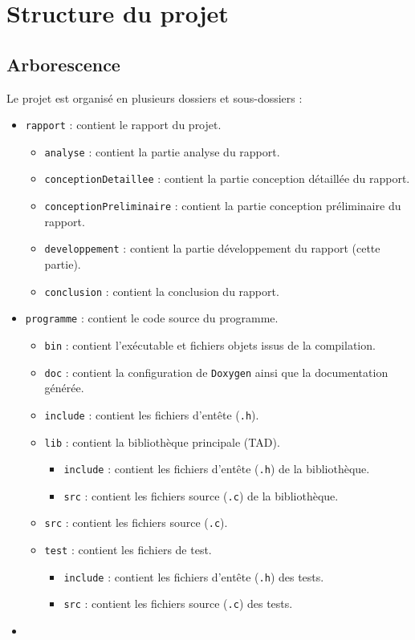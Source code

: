 \section{Structure du projet}

\subsection{Arborescence}

Le projet est organisé en plusieurs dossiers et sous-dossiers :

\begin{itemize}
    \item \texttt{rapport} : contient le rapport du projet.
    \begin{itemize}
        \item \texttt{analyse} : contient la partie analyse du rapport.
        \item \texttt{conceptionDetaillee} : contient la partie conception détaillée du rapport.
        \item \texttt{conceptionPreliminaire} : contient la partie conception préliminaire du rapport.
        \item \texttt{developpement} : contient la partie développement du rapport (cette partie).
        \item \texttt{conclusion} : contient la conclusion du rapport.
    \end{itemize}
    \item \texttt{programme} : contient le code source du programme.
    \begin{itemize}
        \item \texttt{bin} : contient l'exécutable et fichiers objets issus de la compilation.
        \item \texttt{doc} : contient la configuration de \texttt{Doxygen} ainsi que la documentation générée.
        \item \texttt{include} : contient les fichiers d'entête (\texttt{.h}).
        \item \texttt{lib} : contient la bibliothèque principale (TAD).
        \begin{itemize}
            \item \texttt{include} : contient les fichiers d'entête (\texttt{.h}) de la bibliothèque.
            \item \texttt{src} : contient les fichiers source (\texttt{.c}) de la bibliothèque. 
        \end{itemize}
        \item \texttt{src} : contient les fichiers source (\texttt{.c}).
        \item \texttt{test} : contient les fichiers de test.
        \begin{itemize}
            \item \texttt{include} : contient les fichiers d'entête (\texttt{.h}) des tests.
            \item \texttt{src} : contient les fichiers source (\texttt{.c}) des tests.
        \end{itemize}
    \end{itemize}
    \item 
\end{itemize}

